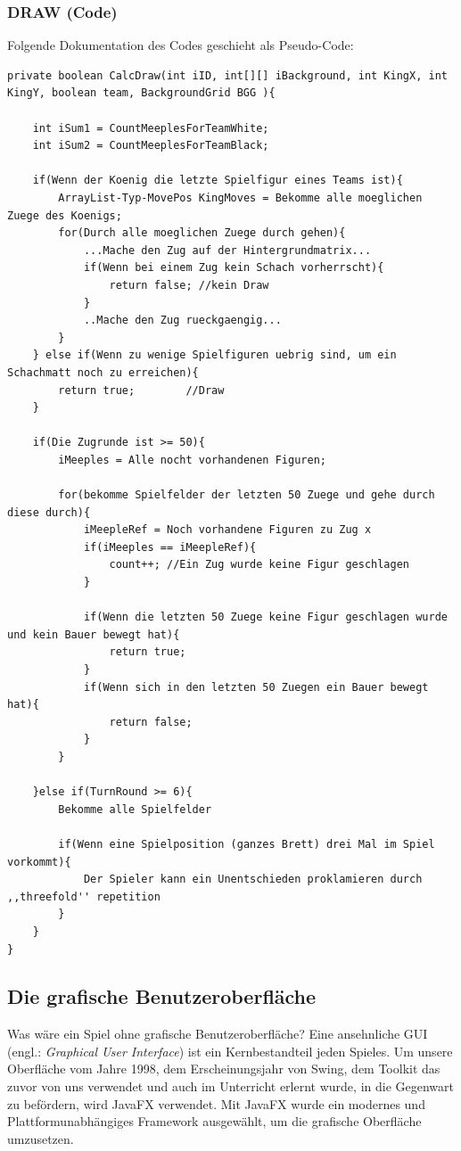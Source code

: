 \documentclass[12pt,a4paper]{article}
\begin{document}
 \subsubsection{DRAW (Code)}
 \label{SUBSUBSEC:DRAW-CODE}

Folgende Dokumentation des Codes geschieht als Pseudo-Code:

\textbf{\lstset{language=Java}}
\begin{lstlisting}
private boolean CalcDraw(int iID, int[][] iBackground, int KingX, int KingY, boolean team, BackgroundGrid BGG ){
	
	int iSum1 = CountMeeplesForTeamWhite;
	int iSum2 = CountMeeplesForTeamBlack;
	
	if(Wenn der Koenig die letzte Spielfigur eines Teams ist){
		ArrayList-Typ-MovePos KingMoves = Bekomme alle moeglichen Zuege des Koenigs;
		for(Durch alle moeglichen Zuege durch gehen){ 
			...Mache den Zug auf der Hintergrundmatrix...
			if(Wenn bei einem Zug kein Schach vorherrscht){
				return false; //kein Draw
			}		
			..Mache den Zug rueckgaengig...
		}		
	} else if(Wenn zu wenige Spielfiguren uebrig sind, um ein Schachmatt noch zu erreichen){
		return true;		//Draw
	}
	
	if(Die Zugrunde ist >= 50){
		iMeeples = Alle nocht vorhandenen Figuren;
		
		for(bekomme Spielfelder der letzten 50 Zuege und gehe durch diese durch){
			iMeepleRef = Noch vorhandene Figuren zu Zug x
			if(iMeeples == iMeepleRef){
				count++; //Ein Zug wurde keine Figur geschlagen
			}
			
			if(Wenn die letzten 50 Zuege keine Figur geschlagen wurde und kein Bauer bewegt hat){
				return true;
			}
			if(Wenn sich in den letzten 50 Zuegen ein Bauer bewegt hat){
				return false;
			}
		}
		
	}else if(TurnRound >= 6){
		Bekomme alle Spielfelder 	
	
		if(Wenn eine Spielposition (ganzes Brett) drei Mal im Spiel vorkommt){
			Der Spieler kann ein Unentschieden proklamieren durch ,,threefold'' repetition
		}
	}
}
\end{lstlisting}



\newpage
\subsection{Die grafische Benutzeroberfläche}
Was wäre ein Spiel ohne grafische Benutzeroberfläche? Eine ansehnliche GUI (engl.: \textit{Graphical User Interface}) ist ein Kernbestandteil jeden Spieles. Um unsere Oberfläche vom Jahre 1998, dem Erscheinungsjahr von Swing, dem Toolkit das zuvor von uns verwendet und auch im Unterricht erlernt wurde, in die Gegenwart zu befördern, wird JavaFX verwendet. Mit JavaFX wurde ein modernes und Plattformunabhängiges Framework ausgewählt, um die grafische Oberfläche umzusetzen.
\end{document}
